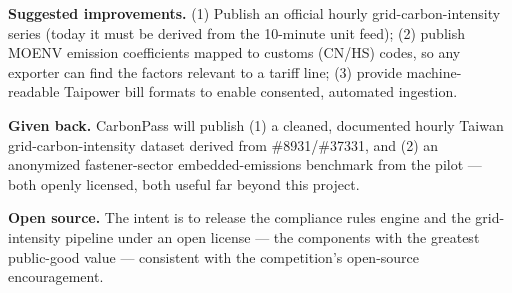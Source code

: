 \textbf{Suggested improvements.} (1) Publish an official hourly
grid-carbon-intensity series (today it must be derived from the 10-minute unit
feed); (2) publish MOENV emission coefficients mapped to customs (CN/HS)
codes, so any exporter can find the factors relevant to a tariff line; (3)
provide machine-readable Taipower bill formats to enable consented,
automated ingestion.

\textbf{Given back.} CarbonPass will publish (1) a cleaned, documented hourly
Taiwan grid-carbon-intensity dataset derived from \#8931/\#37331, and (2) an
anonymized fastener-sector embedded-emissions benchmark from the pilot ---
both openly licensed, both useful far beyond this project.

\textbf{Open source.} The intent is to release the compliance rules engine and
the grid-intensity pipeline under an open license --- the components with the
greatest public-good value --- consistent with the competition's open-source
encouragement\cite{handbook}.
